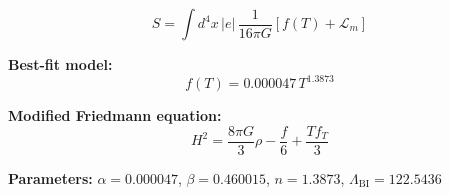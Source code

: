 
\begin{equation}
  S = \int d^4x \, |e| \, \frac{1}{16\pi G} \left[ f(T) + \mathcal{L}_m \right]
\end{equation}

\textbf{Best-fit model:}
\begin{equation}
  f(T) = 0.000047 \, T^{1.3873}
\end{equation}

\textbf{Modified Friedmann equation:}
\begin{equation}
  H^2 = \frac{8\pi G}{3} \rho - \frac{f}{6} + \frac{T f_T}{3}
\end{equation}

\textbf{Parameters:}
$\alpha = 0.000047$, \quad
$\beta = 0.460015$, \quad
$n = 1.3873$, \quad
$\Lambda_{\text{BI}} = 122.5436$
